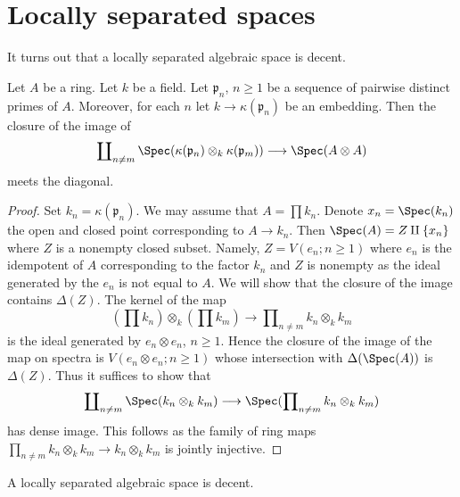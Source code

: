 \section{Locally separated spaces}
\label{section-locally-separated}

\noindent
It turns out that a locally separated algebraic space is decent.

\begin{lemma}
\label{lemma-infinite-number}
Let $A$ be a ring. Let $k$ be a field. Let $\mathfrak p_n$, $n \geq 1$
be a sequence of pairwise distinct primes of $A$. Moreover, for each
$n$ let $k \to \kappa(\mathfrak p_n)$ be an embedding. Then the closure
of the image of
$$
\coprod\nolimits_{n \not = m}
\Spec(\kappa(\mathfrak p_n) \otimes_k \kappa(\mathfrak p_m))
\longrightarrow
\Spec(A \otimes A)
$$
meets the diagonal.
\end{lemma}

\begin{proof}
Set $k_n = \kappa(\mathfrak p_n)$. We may assume that $A = \prod k_n$.
Denote $x_n = \Spec(k_n)$ the open and closed point corresponding to
$A \to k_n$. Then $\Spec(A) = Z \amalg \{x_n\}$ where $Z$ is a nonempty
closed subset. Namely, $Z = V(e_n; n \geq 1)$ where $e_n$
is the idempotent of $A$ corresponding to the factor $k_n$
and $Z$ is nonempty as the ideal generated by the $e_n$ is not
equal to $A$. We will show that the closure of the image
contains $\Delta(Z)$. The kernel of the map
$$
(\prod k_n) \otimes_k (\prod k_m)
\longrightarrow
\prod\nolimits_{n \not = m} k_n \otimes_k k_m
$$
is the ideal generated by $e_n \otimes e_n$, $n \geq 1$.
Hence the closure of the image of the map on spectra is 
$V(e_n \otimes e_n; n \geq 1)$ whose intersection with $\Delta(\Spec(A))$
is $\Delta(Z)$. Thus it suffices to show that
$$
\coprod\nolimits_{n \not = m} \Spec(k_n \otimes_k k_m)
\longrightarrow
\Spec(\prod\nolimits_{n \not = m} k_n \otimes_k k_m)
$$
has dense image. This follows as the family of ring maps
$\prod_{n \not = m} k_n \otimes_k k_m \to k_n \otimes_k k_m$
is jointly injective.
\end{proof}

\begin{lemma}
\label{lemma-locally-separated-decent}
A locally separated algebraic space is decent.
\end{lemma}

